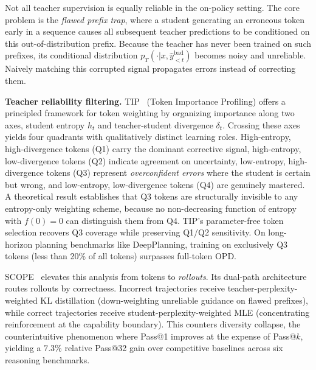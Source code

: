 \documentclass{article} %
\newcommand{\pteacher}{p_T}
\begin{document}
Not all teacher supervision is equally reliable in the on-policy setting. The core problem is the \emph{flawed prefix trap}, where a student generating an erroneous token early in a sequence causes all subsequent teacher predictions to be conditioned on this out-of-distribution prefix. Because the teacher has never been trained on such prefixes, its conditional distribution $\pteacher(\cdot|x, \hat{y}_{<t}^{\text{bad}})$ becomes noisy and unreliable. Naively matching this corrupted signal propagates errors instead of correcting them.

\textbf{Teacher reliability filtering.} TIP~\citep{2604.14084} (Token Importance Profiling) offers a principled framework for token weighting by organizing importance along two axes, student entropy $h_t$ and teacher-student divergence $\delta_t$. Crossing these axes yields four quadrants with qualitatively distinct learning roles. High-entropy, high-divergence tokens (Q1) carry the dominant corrective signal, high-entropy, low-divergence tokens (Q2) indicate agreement on uncertainty, low-entropy, high-divergence tokens (Q3) represent \emph{overconfident errors} where the student is certain but wrong, and low-entropy, low-divergence tokens (Q4) are genuinely mastered. A theoretical result establishes that Q3 tokens are structurally invisible to any entropy-only weighting scheme, because no non-decreasing function of entropy with $f(0)=0$ can distinguish them from Q4. TIP's parameter-free token selection recovers Q3 coverage while preserving Q1/Q2 sensitivity. On long-horizon planning benchmarks like DeepPlanning, training on exclusively Q3 tokens (less than 20\% of all tokens) surpasses full-token OPD.

SCOPE~\citep{2604.10688} elevates this analysis from tokens to \emph{rollouts}. Its dual-path architecture routes rollouts by correctness. Incorrect trajectories receive teacher-perplexity-weighted KL distillation (down-weighting unreliable guidance on flawed prefixes), while correct trajectories receive student-perplexity-weighted MLE (concentrating reinforcement at the capability boundary). This counters diversity collapse, the counterintuitive phenomenon where Pass@1 improves at the expense of Pass@$k$, yielding a 7.3\% relative Pass@32 gain over competitive baselines across six reasoning benchmarks.
\end{document}
